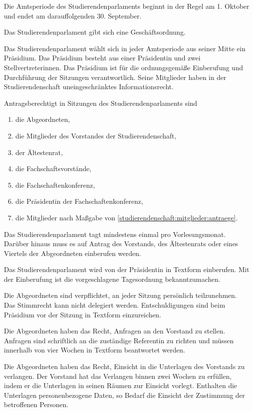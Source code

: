 \begin{jurdoc}
Die Amtsperiode des Studierendenparlaments beginnt in der Regel am 1. Oktober und endet am darauffolgenden 30. September.



Das Studierendenparlament gibt sich eine Geschäftsordnung.

Das Studierendenparlament wählt sich in jeder Amtsperiode aus seiner Mitte ein Präsidium. Das Präsidium besteht aus einer Präsidentin und zwei Stellvertreterinnen. Das Präsidium ist für die ordnungsgemäße Einberufung und Durchführung der Sitzungen verantwortlich. Seine Mitglieder haben in der Studierendenschaft uneingeschränktes Informationsrecht.

Antragsberechtigt in Sitzungen des Studierendenparlaments sind
  \begin{enumerate}
  \item die Abgeordneten,
  \item die Mitglieder des Vorstandes der Studierendenschaft,
  \item der Ältestenrat,
  \item die Fachschaftsvorstände,
  \item die Fachschaftenkonferenz,
  \item die Präsidentin der Fachschaftenkonferenz,
  \item die Mitglieder nach Maßgabe von \ref{studierendenschaft:mitglieder:antraege}.
  \end{enumerate}

Das Studierendenparlament tagt mindestens einmal pro Vorlesungsmonat. Darüber hinaus muss es auf Antrag des Vorstands, des Ältestenrats oder eines Viertels der Abgeordneten einberufen werden.

Das Studierendenparlament wird von der Präsidentin in Textform einberufen. Mit der Einberufung ist die vorgeschlagene Tagesordnung bekanntzumachen.

Die Abgeordneten sind verpflichtet, an jeder Sitzung persönlich teilzunehmen. Das Stimmrecht kann nicht delegiert werden. Entschuldigungen sind beim Präsidium vor der Sitzung in Textform einzureichen.

Die Abgeordneten haben das Recht, Anfragen an den Vorstand zu stellen. Anfragen sind schriftlich an die zuständige Referentin zu richten und müssen innerhalb von vier Wochen in Textform beantwortet werden.

Die Abgeordneten haben das Recht, Einsicht in die Unterlagen des Vorstands zu verlangen. Der Vorstand hat das Verlangen binnen zwei Wochen zu erfüllen, indem er die Unterlagen in seinen Räumen zur Einsicht vorlegt. Enthalten die Unterlagen personenbezogene Daten, so Bedarf die Einsicht der Zustimmung der betroffenen Personen.



\end{jurdoc}
